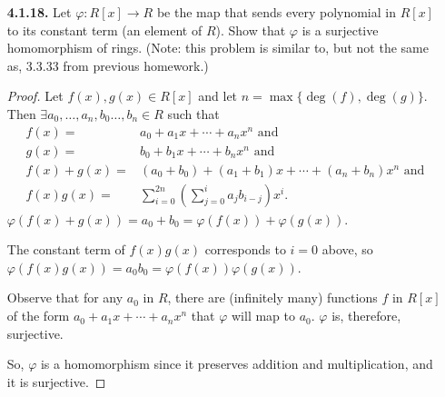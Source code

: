 \documentclass[12pt]{article}
\newcommand{\such}{\text{ s.t. }}
\begin{document}
\begin{itemize}
\textit{Claim}: statement above is true.
\par
\begin{proof}
  $r$ is a zero divisor in $R$, so $r\neq 0_R$ and $\exists k \in R \such k \neq 0_R$ and $rk = 0_R$.
  $f$ is a homomorphism of rings, so $f(rk) = f(r) f(k)$ (definition) and $f(0_R) = 0_S$ (Theorem 3.10).
  Since $f(r) f(k) = 0_S$, $f(r)$ is, by definition, a zero divisor in $S$.
\end{proof}

\textit{questions:\\
If $k \in R$ nonzero, is $f(k)$ always nonzero in $S$?\\
\st{If $a = b$, does $f(a) = f(b)$?}}

\item[\textbf{4.1.18.}] Let $\varphi:R[x]\to R$ be the map that sends every polynomial in $R[x]$ to its constant term (an element of $R$). Show that $\varphi$ is a surjective homomorphism of rings. (Note: this problem is similar to, but not the same as, 3.3.33 from previous homework.)

\begin{proof}
  Let $f(x), g(x)\in R[x]$ and let $n={\max}\{\deg(f), \deg(g)\}$. Then $\exists a_0,\dotsc, a_n,b_0\dotsc,b_n\in R$ such that
  \begin{align*}
    f(x) =& a_0 + a_1x + \dotsb + {a_n}x^n \text{ and}\\
    g(x) =& b_0 + b_1x + \dotsb + {b_n}x^n \text{ and}\\
    f(x) + g(x) =& (a_0 + b_0) + (a_1 + b_1)x + \dotsb + (a_n + b_n)x^n \text{ and}\\
    f(x) g(x) =& \sum_{i=0}^{2n}\left( \sum_{j=0}^{i} {a_j}b_{i-j}\right) x^i\text{.}
  \end{align*}
  $\varphi(f(x)+g(x)) = a_0 + b_0 = \varphi(f(x)) + \varphi(g(x))$.
  \par
  The constant term of $f(x) g(x)$ corresponds to $i=0$ above, so $\varphi(f(x) g(x)) = a_0  b_0 = \varphi(f(x)) \varphi(g(x))$.
  \par
  Observe that for any $a_0$ in $R$, there are (infinitely many) functions $f$ in $R[x]$ of the form $a_0 + a_1 x + \dotsb + a_n x^n$ that $\varphi$ will map to $a_0$.
  $\varphi$ is, therefore, surjective.
  \par
  So, $\varphi$ is a homomorphism since it preserves addition and multiplication, and it is surjective.
\end{proof}


\end{itemize}
\end{document}
